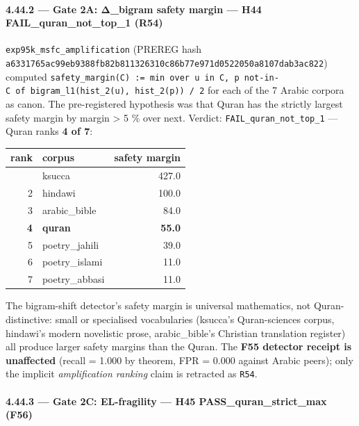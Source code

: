 \documentclass[
]{article}
\newcounter{none} %
\begin{document}
\paragraph{4.44.2 --- Gate 2A: Δ\_bigram safety margin --- H44
FAIL\_quran\_not\_top\_1
(R54)}\label{gate-2a-ux3b4_bigram-safety-margin-h44-fail_quran_not_top_1-r54}

\texttt{exp95k\_msfc\_amplification} (PREREG hash
\texttt{a6331765ac99eb9388fb82b811326310c86b77e971d0522050a8107dab3ac822})
computed
\texttt{safety\_margin(C)\ :=\ min\ over\ u\ in\ C,\ p\ not-in-C\ of\ bigram\_l1(hist\_2(u),\ hist\_2(p))\ /\ 2}
for each of the 7 Arabic corpora as canon. The pre-registered hypothesis
was that Quran has the strictly largest safety margin by margin
\textgreater{} 5 \% over next. Verdict:
\texttt{FAIL\_quran\_not\_top\_1} --- Quran ranks \textbf{4 of 7}:

{\def\LTcaptype{none} %
\begin{longtable}[]{@{}rlr@{}}
\toprule\noalign{}
rank & corpus & safety margin \\
\midrule\noalign{}
\endhead
\bottomrule\noalign{}
\endlastfoot
1 & ksucca & 427.0 \\
2 & hindawi & 100.0 \\
3 & arabic\_bible & 84.0 \\
\textbf{4} & \textbf{quran} & \textbf{55.0} \\
5 & poetry\_jahili & 39.0 \\
6 & poetry\_islami & 11.0 \\
7 & poetry\_abbasi & 11.0 \\
\end{longtable}
}

The bigram-shift detector's safety margin is universal mathematics, not
Quran-distinctive: small or specialised vocabularies (ksucca's
Quran-sciences corpus, hindawi's modern novelistic prose,
arabic\_bible's Christian translation register) all produce larger
safety margins than the Quran. The \textbf{F55 detector receipt is
unaffected} (recall = 1.000 by theorem, FPR = 0.000 against Arabic
peers); only the implicit \emph{amplification ranking} claim is
retracted as \texttt{R54}.

\paragraph{4.44.3 --- Gate 2C: EL-fragility --- H45
PASS\_quran\_strict\_max
(F56)}\label{gate-2c-el-fragility-h45-pass_quran_strict_max-f56}
\end{document}

